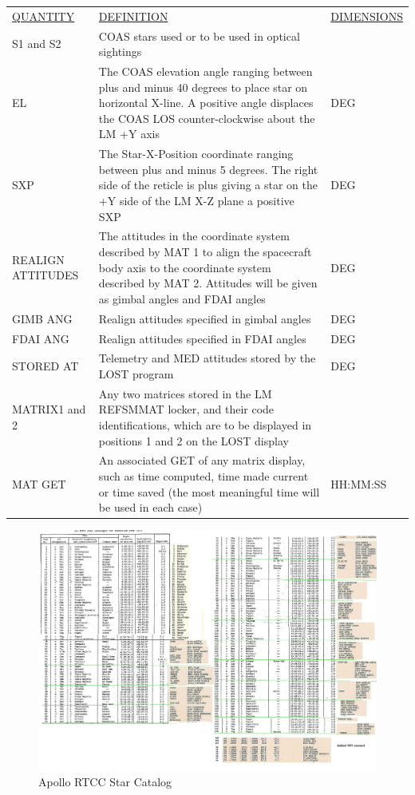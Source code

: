 \documentclass[11pt]{article} %
\begin{document}
\newpage

\begin{center}
\begin{tabular}{ L{2.4cm} L{7.1cm} L{3cm} }
\underline{QUANTITY} & \underline{DEFINITION} & \underline{DIMENSIONS} \\
S1 and S2&COAS stars used or to be used in optical sightings&\\
EL&The COAS elevation angle ranging between plus and minus 40 degrees to place star on horizontal X-line. A positive angle displaces the COAS LOS counter-clockwise about the LM +Y axis&DEG\\
SXP&The Star-X-Position coordinate ranging between plus and minus 5 degrees. The right side of the reticle is plus giving a star on the +Y side of the LM X-Z plane a positive SXP&DEG\\
REALIGN ATTITUDES&The attitudes in the coordinate system described by MAT 1 to align the spacecraft body axis to the coordinate system described by MAT 2. Attitudes will be given as gimbal angles and FDAI angles&DEG\\
GIMB ANG&Realign attitudes specified in gimbal angles&DEG\\
FDAI ANG&Realign attitudes specified in FDAI angles&DEG\\
STORED AT&Telemetry and MED attitudes stored by the LOST program&DEG\\
MATRIX1 and 2&Any two matrices stored in the LM REFSMMAT locker, and their code identifications, which are to be displayed in positions 1 and 2 on the LOST display&\\
MAT GET&An associated GET of any matrix display, such as time computed, time made current or time saved (the most meaningful time will be used in each case)&HH:MM:SS\\
\end{tabular}
\end{center}

\newpage

\begin{landscape}
\begin{figure}[hbtp]
	\centering
		\includegraphics[width=1.3\textwidth]{./ApolloRTCCMFDFiles/Apollo RTCC STARS.jpg}
	\caption{Apollo RTCC Star Catalog}
	\label{fig:RTCCStars}
\end{figure}
\end{landscape}
\newpage
\end{document}
